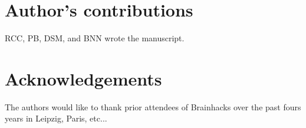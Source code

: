 \documentclass[11pt]{bmc_article_s50}
\begin{document}
\section*{Author's contributions}
RCC, PB, DSM, and BNN wrote the manuscript.

\section*{Acknowledgements}
The authors would like to thank prior attendees of Brainhacks over the past fours years in Leipzig, Paris, etc... 






 
 
\end{document}
